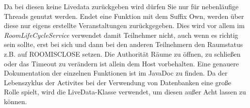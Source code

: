 Da bei diesen keine Livedata zurückgeben wird dürfen Sie nur für nebenläufige Threads genutzt werden. 
Endet eine Funktion mit dem Suffix Own, werden über diese nur eigens erstellte Veranstaltungen zurückgegeben.
Dies wird vor allem im \textit{RoomLifeCycleService} verwendet damit Teilnehmer nicht, auch wenn es richtig sein sollte, erst bei sich und dann bei den anderen Teilnehmern den Raumstatus z.B. auf ROOMISCLOSE setzen. 
 Die Authorität Räume zu öffnen, zu schließen oder das Timeout zu verändern ist allein dem Host vorbehalten.
 Eine genauere Dokumentation der einzelnen Funktionen ist im JavaDoc zu finden.
Da der Lebenszyklus der Activites bei der Verwendung von Datenbanken eine große Rolle  spielt, wird die LiveData-Klasse verwendet, um diesen außer Acht lassen zu können. 

\begin{table}[]
\caption{Struktur der Datenbanktabelle dbParticipant}
\label{tab:dbParticipant}
\centering
{}
\end{table}


\begin{table}[]
\caption{Struktur der Datenbanktabelle dbRoom}
\label{tab:dbRoom}
\end{table}

